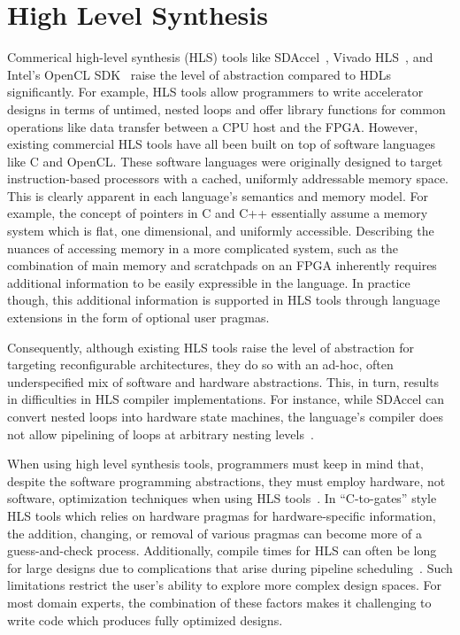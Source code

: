 \section{High Level Synthesis}
Commerical high-level synthesis (HLS) tools like SDAccel~\cite{sdaccel}, Vivado HLS~\cite{vivadohls},
and Intel's OpenCL SDK~\cite{opencl_sdk} raise the level of abstraction compared to HDLs significantly.
For example, HLS tools allow programmers to write accelerator designs in terms of untimed, nested loops
and offer library functions for common operations like data transfer between a CPU host and the FPGA.
However, existing commercial HLS tools have all been built on top of software languages like C and OpenCL.
These software languages were originally designed to target instruction-based processors with a cached, uniformly addressable memory space.
This is clearly apparent in each language's semantics and memory model.
For example, the concept of pointers in C and C++ essentially assume a memory system which is flat, one dimensional, and uniformly accessible.
Describing the nuances of accessing memory in a more complicated system, such as the combination of main memory and
scratchpads on an FPGA inherently requires additional information to be easily expressible in the language.
In practice though, this additional information is supported in HLS tools through language
extensions in the form of optional user pragmas.

Consequently, although existing HLS tools raise the level of abstraction for targeting reconfigurable architectures,
they do so with an ad-hoc, often underspecified mix of software and hardware abstractions.
This, in turn, results in difficulties in HLS compiler implementations.
For instance, while SDAccel can convert nested loops into hardware state machines,
the language's compiler does not allow pipelining of loops at arbitrary nesting levels~\cite{vivado_userguide}.

When using high level synthesis tools, programmers must keep in mind that,
despite the software programming abstractions, they must employ hardware,
not software, optimization techniques when using HLS tools~\cite{nane2016survey}.
In ``C-to-gates'' style HLS tools which relies on hardware pragmas
for hardware-specific information, the addition, changing, or
removal of various pragmas can become more of a guess-and-check
process. Additionally, compile times for HLS can often be long for large designs due to
complications that arise during pipeline scheduling~\cite{Aladdin}.
Such limitations restrict the user's ability to explore more complex design spaces.
For most domain experts, the combination of these factors makes it challenging to write code which produces fully optimized designs.

